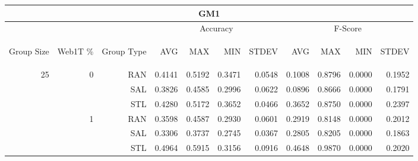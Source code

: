 \begin{center}
\begin{table}[htbp]
\begin{tabular}{ | r | r | r | r | r | r | r | r | r | r | r |}
\hline
\multicolumn{11}{|c|}{GM1}\\
\hline
 & & & \multicolumn{4}{|c|}{Accuracy} & \multicolumn{4}{|c|}{F-Score}\\ \cline{4-11}
\begin{sideways}Group Size\end{sideways} & \begin{sideways}Web1T \%\end{sideways} & \begin{sideways}Group Type\end{sideways} & \begin{sideways}AVG\end{sideways} & \begin{sideways}MAX\end{sideways} & \begin{sideways}MIN\end{sideways} & \begin{sideways}STDEV\end{sideways} & \begin{sideways}AVG\end{sideways} & \begin{sideways}MAX\end{sideways} & \begin{sideways}MIN\end{sideways} & \begin{sideways}STDEV\end{sideways}\\
\hline
\multirow{18}{*}{25}
 & \multirow{3}{*}{0} & RAN & 0.4141 & 0.5192 & 0.3471 & 0.0548 & 0.1008 & 0.8796 & 0.0000 & 0.1952\\ \cline{3-11}
 &   & SAL & 0.3826 & 0.4585 & 0.2996 & 0.0622 & 0.0896 & 0.8666 & 0.0000 & 0.1791\\ \cline{3-11}
 &   & STL & 0.4280 & 0.5172 & 0.3652 & 0.0466 & 0.3652 & 0.8750 & 0.0000 & 0.2397\\ \cline{2-11}
 & \multirow{3}{*}{1} & RAN & 0.3598 & 0.4587 & 0.2930 & 0.0601 & 0.2919 & 0.8148 & 0.0000 & 0.2012\\ \cline{3-11}
 &   & SAL & 0.3306 & 0.3737 & 0.2745 & 0.0367 & 0.2805 & 0.8205 & 0.0000 & 0.1863\\ \cline{3-11}
 &   & STL & 0.4964 & 0.5915 & 0.3156 & 0.0916 & 0.4648 & 0.9870 & 0.0000 & 0.2020\\ \cline{2-11}

\end{tabular}
\end{table}
\end{center}
